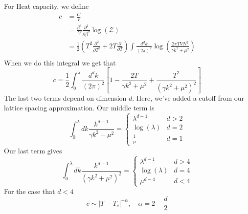 For Heat capacity, we define 
\begin{align*}
	c &=  \frac{C}{V } \\
	  &=  \frac{\beta^2}{V  } \frac{\partial^ 2 }{\partial \beta^2 } \log ( \mathcal{ Z })  \\
	  &=  \frac{1}{2 } \left( T^2 \frac{\partial ^2 }{\partial T^ 2}  + 2T \frac{\partial  }{\partial T }  \right) \int \frac{d^{ d }k }{ ( 2 \pi ) ^ 2 } \log \left( \frac{ 2 \pi T V N^ 2 }{ \gamma k^ 2 + \mu^ 2 } \right)  \\
\end{align*} 
When we do this integral we get that 
\[
	c = \frac{1}{2 } \int_0^{ \lambda }  \frac{ d^{ d }k }{ ( 2 \pi ) ^  2} \left[ 1 - \frac{ 2T }{\gamma k^ 2 + \mu ^ 2 } + \frac{ T^ 2 }{ ( \gamma k^2 + \mu^ 2 )^ 2 } \right] 
\] The last two terms depend on dimension $ d $.
Here, we've added a cutoff from our lattice spacing approximation. 
Our middle term is 
\[
 \int_{ 0 }^\lambda dk \frac{ k^{ d - 1 } }{\gamma k^2 + \mu^2 } = \begin{cases}
 \lambda^{ d - 1} & d > 2 \\
 \log ( \lambda ) & d = 2 \\
 \frac{1}{\mu} & d =1 
 \end{cases} 
\] Our last term gives 
\[
	\int_{ 0 }^\lambda dk \frac{k^{ d - 1 }  }{ ( \gamma k ^ 2+ \mu^ 2)^ 2  } = \begin{cases}
		\lambda^{ d - 1} & d > 4 \\
		\log ( \lambda ) & d = 4 \\
		\mu^{ d - 4 } & d < 4 
	\end{cases}
\] For the case that $ d < 4 $
 \[
 c \sim | T - T_c |^{ - \alpha}, \quad \alpha  = 2 - \frac{d}{2 }
\] 


